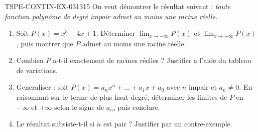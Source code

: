 \begin{exercice}{TSPE-CONTIN-EX-031}{3}{15}
On veut démontrer le résultat suivant : \emph{toute fonction polynôme de degré impair admet au moins une racine réelle}.

\begin{enumerate}
  \item Soit $P(x) = x^3 - 4x + 1$. Déterminer $\displaystyle\lim_{x \to -\infty}P(x)$ et $\displaystyle\lim_{x \to +\infty}P(x)$, puis montrer que $P$ admet au moins une racine réelle.
  \item Combien $P$ a-t-il exactement de racines réelles ? Justifier a l'aide du tableau de variations.
  \item Generaliser : soit $P(x) = a_n x^n + \dots + a_1 x + a_0$ avec $n$ impair et $a_n
\neq 0$. En raisonnant sur le terme de plus haut degré, déterminer les limites de $P$ en $-\infty$ et $+\infty$ selon le signe de $a_n$, puis conclure.
  \item Le résultat subsiste-t-il si $n$ est pair ? Justifier par un contre-exemple.
\end{enumerate}
\end{exercice}
